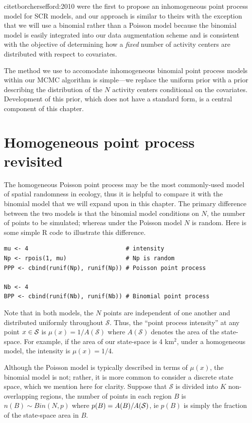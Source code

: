 \documentclass{book}
\begin{document}
citet{borchersefford:2010} were the first to propose an
inhomogeneous point process model for SCR models, and our approach is
similar to theirs with the exception that we will use a binomial
rather than a Poisson model because the binomial model is
easily integrated into our data augmentation scheme and is consistent
with the objective of determining how a {\it fixed} number of activity
centers are distributed with respect to covariates.

The method we use to accomodate inhomogeneous binomial point process
models within our MCMC algorithm is simple---we
replace the uniform prior with a prior describing the
distribution of
the $N$ activity centers conditional on the covariates. Development of
this prior, which does not have a
standard form, is a central component of this chapter.


\section{Homogeneous point process revisited}

The homogeneous Poisson point process may be the most commonly-used model of
spatial randomness in ecology, thus it is helpful to compare it with
the binomial model that we will expand upon in this chapter. The
primary difference between the two models is that the binomial model
conditions on $N$, the number of points to be simulated; whereas under
the Poisson model $N$ is random. Here is some simple R code to
illustrate this difference.

\begin{verbatim}
mu <- 4                            # intensity
Np <- rpois(1, mu)                 # Np is random
PPP <- cbind(runif(Np), runif(Np)) # Poisson point process

Nb <- 4
BPP <- cbind(runif(Nb), runif(Nb)) # Binomial point process
\end{verbatim}

Note that in both models, the $N$ points are independent
of one another and distributed uniformly
throughout $\mathcal{S}$. Thus, the ``point process
intensity'' at any point $x \in \cal{S}$ is $\mu(x) = 1 /
A(\mathcal{S})$ where $A(\mathcal{S})$ denotes the area of the
state-space. For example, if the area of our state-space is 4 km$^2$,
under a homogeneous model, the intensity is $\mu(x) = 1/4$.

Although the Poisson model is typically described in terms of $\mu(x)$,
the binomial model is not; rather, it
is more common to consider a discrete state space, which we mention
here for clarity. Suppose that $\mathcal{S}$ is divided into $K$ non-overlapping
regions, the number of points in each region $B$ is $n(B) \sim Bin(N, p)$
where $p(B) = A(B)/A(\cal{S})$, ie $p(B)$ is simply the fraction of
the state-space area in $B$.
\end{document}
